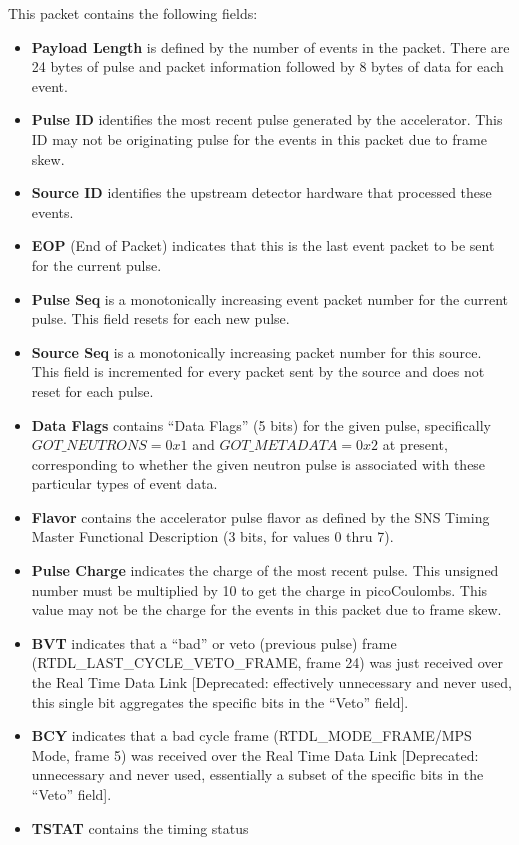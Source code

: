 This packet contains the following fields:
\begin{itemize}
\item{\bf Payload Length} is defined by the number of events in the packet.
There are 24 bytes of pulse and packet information followed by 8 bytes of
data for each event.
\item{\bf Pulse ID} identifies the most recent pulse generated by the
accelerator. This ID may not be originating pulse for the events
in this packet due to frame skew.
\item{\bf Source ID} identifies the upstream detector hardware that
processed these events.
\item{\bf EOP} (End of Packet) indicates that this is the last event packet
to be sent for the current pulse.
\item{\bf Pulse Seq} is a monotonically increasing event packet number
for the current pulse.
This field resets for each new pulse.
\item{\bf Source Seq} is a monotonically increasing packet number
for this source.
This field is incremented for every packet sent by the source and does not
reset for each pulse.
\item{\bf Data Flags} contains ``Data Flags'' (5 bits) for the given pulse,
specifically $ GOT\_NEUTRONS = 0x1 $ and $ GOT\_METADATA = 0x2 $
at present,
corresponding to whether the given neutron pulse is associated with
these particular types of event data.
\item{\bf Flavor} contains the accelerator pulse flavor as defined by
the SNS Timing Master Functional Description
(3 bits, for values 0 thru 7).
\item{\bf Pulse Charge} indicates the charge of the most recent pulse. This
unsigned number must be multiplied by 10 to get the charge in picoCoulombs. This
value may not be the charge for the events in this packet due to frame skew.
\item{\bf BVT} indicates that a ``bad'' or veto (previous pulse) frame
(RTDL\_LAST\_CYCLE\_VETO\_FRAME, frame 24) was just received over the
Real Time Data Link [Deprecated: effectively unnecessary and never used,
this single bit aggregates the specific bits in the ``Veto'' field].
\item{\bf BCY} indicates that a bad cycle frame
(RTDL\_MODE\_FRAME/MPS Mode, frame 5) was received over the
Real Time Data Link
[Deprecated: unnecessary and never used, essentially a subset of the
specific bits in the ``Veto'' field].
\item{\bf TSTAT} contains the timing status

\end{itemize}
